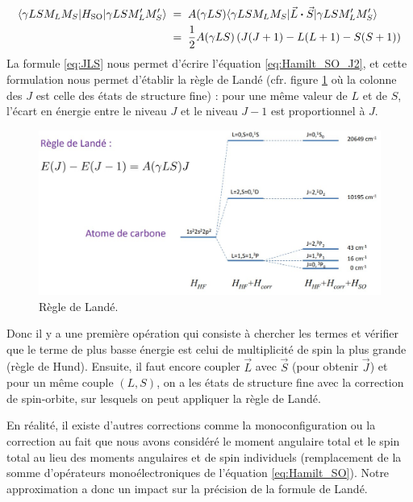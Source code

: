 \begin{align}
    \langle \gamma LSM_LM_S|H_\text{SO}|\gamma LSM_L'M_S' \rangle &\; = \;  A(\gamma LS)\langle \gamma LSM_LM_S|\vec{L}\boldsymbol{\cdot}\vec{S}|\gamma LSM_L'M_S' \rangle
    \label{eq:Hamilt_SO_J1}    \\
    &\; = \;
    \dfrac{1}{2}A(\gamma LS)\left( J(J+1)-L(L+1)-S(S+1)\right)
    \label{eq:Hamilt_SO_J2}
\end{align}
La formule \eqref{eq:JLS} nous permet d’écrire l'équation \eqref{eq:Hamilt_SO_J2}, et cette formulation nous permet d'établir la règle de Landé (cfr. figure \ref{fig:RegleLandé} où la colonne des $J$ est celle des états de structure fine) : pour une même valeur de $L$ et de $S$, l’écart en énergie entre le niveau $J$ et le niveau $J-1$ est proportionnel à $J$.

\begin{figure}[htp]
    \centering
    \includegraphics[scale=0.50]{Images2/regleLande.jpg}
    \caption{Règle de Landé.}
    \label{fig:RegleLandé}
\end{figure}

Donc il y a une première opération qui consiste à chercher les termes et vérifier que le terme de plus basse énergie est celui de multiplicité de spin la plus grande (règle de Hund). Ensuite, il faut encore coupler $\vec{L}$ avec $\vec{S}$ (pour obtenir $\vec{J}$) et pour un même couple $(L,S)$, on a les états de structure fine avec la correction de spin-orbite, sur lesquels on peut appliquer la règle de Landé.

En réalité, il existe d'autres corrections comme la monoconfiguration ou la correction au fait que nous avons considéré le moment angulaire total et le spin total au lieu des moments angulaires et de spin individuels (remplacement de la somme d'opérateurs monoélectroniques de l'équation \eqref{eq:Hamilt_SO}). Notre approximation a donc un impact sur la précision de la formule de Landé.

